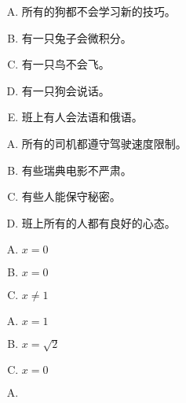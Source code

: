 {{        %
        \begin{practices}
            \begin{enumerate}[A.]
                \item 所有的狗都不会学习新的技巧。
                \item 有一只兔子会微积分。
                \item 有一只鸟不会飞。
                \item 有一只狗会说话。
                \item 班上有人会法语和俄语。
            \end{enumerate}
        \end{practices}

        \begin{practices}
            \begin{enumerate}[A.]
                \item 所有的司机都遵守驾驶速度限制。
                \item 有些瑞典电影不严肃。
                \item 有些人能保守秘密。
                \item 班上所有的人都有良好的心态。
            \end{enumerate}
        \end{practices}

        \begin{practices}
            \begin{enumerate}[A.]
                \item $x = 0$
                \item $x = 0$
                \item $x \neq 1$
            \end{enumerate}
        \end{practices}

        \begin{practices}
            \begin{enumerate}[A.]
                \item $x = 1$
                \item $x = \sqrt{2}$
                \item $x = 0$
            \end{enumerate}
        \end{practices}

        \begin{practices}
            \begin{enumerate}[A.]
                \item 
            \end{enumerate}
        \end{practices}
    }
}
